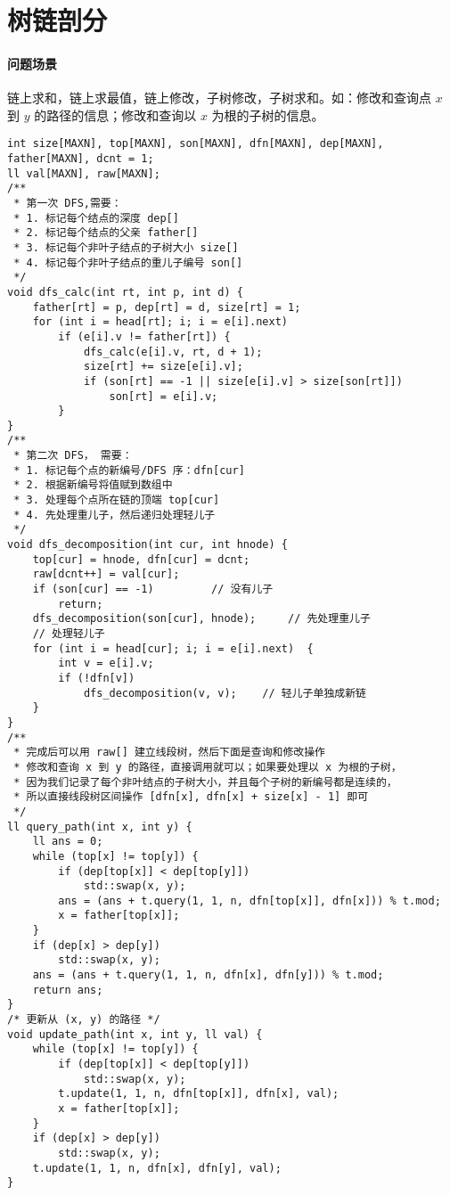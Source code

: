 \section{树链剖分}
\paragraph{问题场景} 链上求和，链上求最值，链上修改，子树修改，子树求和。如：修改和查询点 $x$ 到 $y$ 的路径的信息；修改和查询以 $x$ 为根的子树的信息。
\begin{verbatim}
int size[MAXN], top[MAXN], son[MAXN], dfn[MAXN], dep[MAXN], father[MAXN], dcnt = 1;
ll val[MAXN], raw[MAXN];
/**
 * 第一次 DFS,需要：
 * 1. 标记每个结点的深度 dep[]
 * 2. 标记每个结点的父亲 father[]
 * 3. 标记每个非叶子结点的子树大小 size[]
 * 4. 标记每个非叶子结点的重儿子编号 son[]
 */
void dfs_calc(int rt, int p, int d) {
    father[rt] = p, dep[rt] = d, size[rt] = 1;
    for (int i = head[rt]; i; i = e[i].next)
        if (e[i].v != father[rt]) {
            dfs_calc(e[i].v, rt, d + 1);
            size[rt] += size[e[i].v];
            if (son[rt] == -1 || size[e[i].v] > size[son[rt]])
                son[rt] = e[i].v;
        }
}
/**
 * 第二次 DFS， 需要：
 * 1. 标记每个点的新编号/DFS 序：dfn[cur]
 * 2. 根据新编号将值赋到数组中
 * 3. 处理每个点所在链的顶端 top[cur]
 * 4. 先处理重儿子，然后递归处理轻儿子
 */
void dfs_decomposition(int cur, int hnode) {
    top[cur] = hnode, dfn[cur] = dcnt;
    raw[dcnt++] = val[cur];     
    if (son[cur] == -1)         // 没有儿子
        return;
    dfs_decomposition(son[cur], hnode);     // 先处理重儿子
    // 处理轻儿子
    for (int i = head[cur]; i; i = e[i].next)  {
        int v = e[i].v;
        if (!dfn[v])
            dfs_decomposition(v, v);    // 轻儿子单独成新链
    }
}
/**
 * 完成后可以用 raw[] 建立线段树，然后下面是查询和修改操作
 * 修改和查询 x 到 y 的路径，直接调用就可以；如果要处理以 x 为根的子树，
 * 因为我们记录了每个非叶结点的子树大小，并且每个子树的新编号都是连续的，
 * 所以直接线段树区间操作 [dfn[x], dfn[x] + size[x] - 1] 即可
 */
ll query_path(int x, int y) {
    ll ans = 0;
    while (top[x] != top[y]) {
        if (dep[top[x]] < dep[top[y]])
            std::swap(x, y);
        ans = (ans + t.query(1, 1, n, dfn[top[x]], dfn[x])) % t.mod;
        x = father[top[x]];
    }
    if (dep[x] > dep[y])
        std::swap(x, y);
    ans = (ans + t.query(1, 1, n, dfn[x], dfn[y])) % t.mod;
    return ans;
}
/* 更新从 (x, y) 的路径 */
void update_path(int x, int y, ll val) {
    while (top[x] != top[y]) {
        if (dep[top[x]] < dep[top[y]])
            std::swap(x, y);
        t.update(1, 1, n, dfn[top[x]], dfn[x], val);
        x = father[top[x]];
    }
    if (dep[x] > dep[y])
        std::swap(x, y);
    t.update(1, 1, n, dfn[x], dfn[y], val);
}
\end{verbatim}
